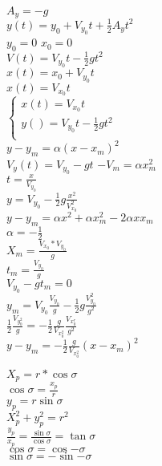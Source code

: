\documentclass{book}
\begin{document}
\begin{multicols}{3}
	$A_y=-g$\\
	$y(t)=y_0+V_{y_0}t+\frac{1}{2}A_yt^2$\\
	$y_0=0$ $x_0=0$\\
	$V(t)=V_{y_0}t-\frac{1}{2}gt^2$\\
	$x(t)=x_0+V_{y_0}t$\\
	$x(t)=V_{x_0}t$\\
	$\begin{cases}
		x(t)=V_{x_0}t\\
		y()=V_{y_0}t-\frac{1}{2}gt^2\\
	\end{cases}$\\
	$y-y_m=\alpha(x-x_m)^2$\\
	$V_y(t)=V_{y_0}-gt$
	$-V_m=\alpha x^2_m$\\
	$t=\frac{x}{V_{y_0}}$\\
	$y=V_{y_0}-\frac{1}{2}g\frac{x^2}{V_{x_0}^2}$\\
	$y-y_m=\alpha x^2+\alpha x^2_m-2\alpha x x_m$\\
	$\alpha=-\frac{1}{2}$\\
	$X_m=\frac{V_{x_0}*V_{y_0}}{g}$\\
	$t_m=\frac{V_{y_0}}{g}$\\
	$V_{y_0}-gt_m=0$\\
	$y_m=V_{y_0}\frac{V_{y_0}}{g}-\frac{1}{2}g\frac{V^2_{y_0}}{g^2}$\\
	$\frac{1}{2}\frac{V_{y_{0}^2}}{g}=-\frac{1}{2}\frac{g}{V_{x_0^2}}\frac{V_{x^r_0}}{g^2}$\\
	$y-y_m=-\frac{1}{2}\frac{g}{V_{x_{0}^2}}(x-x_m)^2$\\
\end{multicols}
\begin{multicols}{3}
	$X_p=r*\cos{\sigma}$\\
	$\cos{\sigma}=\frac{x_p}{r}$\\
	$y_p=r\sin{\sigma}$\\
	$X^2_p+y_p^2=r^2$\\
	$\frac{y_p}{x_p}=\frac{\sin{\sigma}}{\cos{\sigma}}=\tan{\sigma}$\\
	$\cos{\sigma}=\cos{-\sigma}$\\
	$\sin{\sigma}=-\sin{-\sigma}$
\end{multicols}
\end{document}
